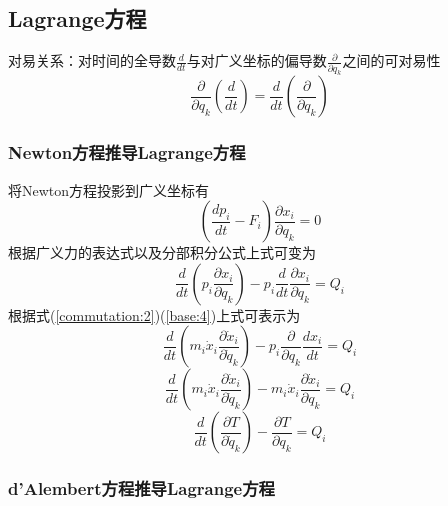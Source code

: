 \documentclass[12pt]{article}
\numberwithin{equation}{section}
\begin{document}
        \subsection{Lagrange方程}

        对易关系：对时间的全导数$\frac{d}{dt}$与对广义坐标的偏导数$\frac{\partial}{\partial q_k}$之间的可对易性
        \begin{equation}\label{commutation:2}
            \frac{\partial}{\partial q_k}\left(\frac{d}{dt}\right)=\frac{d}{dt}\left(\frac{\partial}{\partial q_k}\right)
        \end{equation}

        \subsubsection{Newton方程推导Lagrange方程}
        
        将Newton方程投影到广义坐标有
        \begin{equation*}
            \left(\frac{dp_i}{dt}-F_i\right)\frac{\partial x_i}{\partial q_k}=0
        \end{equation*}
        根据广义力的表达式以及分部积分公式上式可变为
        \begin{equation}\label{deriv:1}
            \frac{d}{dt}\left(p_i\frac{\partial x_i}{\partial q_k}\right)-p_i\frac{d}{dt}\frac{\partial x_i}{\partial q_k}=Q_i
        \end{equation}
        根据式(\ref{commutation:2})(\ref{base:4})上式可表示为
        \begin{equation*}
            \frac{d}{dt}\left(m_i\dot{x}_i\frac{\partial \dot{x}_i}{\partial \dot{q}_k}\right)-p_i\frac{\partial}{\partial q_k}\frac{dx_i}{dt}=Q_i
        \end{equation*}
        \begin{equation*}
            \frac{d}{dt}\left(m_i\dot{x}_i\frac{\partial \dot{x}_i}{\partial \dot{q}_k}\right)-m_i\dot{x}_i\frac{\partial\dot{x}_i}{\partial q_k}=Q_i
        \end{equation*}
        \begin{equation}\label{Lagrange:1}
            \frac{d}{dt}\left(\frac{\partial T}{\partial \dot{q}_k}\right)-\frac{\partial T}{\partial q_k}=Q_i
        \end{equation}

        \subsubsection{d'Alembert方程推导Lagrange方程}
        
\end{document}
